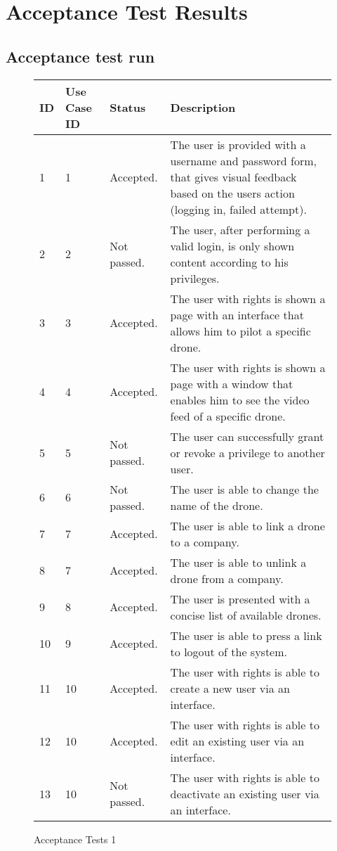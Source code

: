 \chapter{Acceptance Test Results}
\label{appendix:acceptance_test_results}

\section{Acceptance test run}
\begin{figure}[htb]
\begin{center}
\begin{tabular}{ | l | l | l | p{8cm} | }
  \hline
	\textbf{ID} & \textbf{Use Case ID} & \textbf{Status} & \textbf{Description} \\ \hline
	1 & 1 & Accepted. & The user is provided with a username and password form, that gives visual feedback based on the users action (logging in, failed attempt).\\ \hline
	2 & 2 & Not passed. & The user, after performing a valid login, is only shown content according to his privileges. \\ \hline
	3 & 3 & Accepted. & The user with rights is shown a page with an interface that allows him to pilot a specific drone.\\ \hline
	4 & 4 & Accepted. & The user with rights is shown a page with a window that enables him to see the video feed of a specific drone. \\ \hline
	5 & 5 & Not passed. & The user can successfully grant or revoke a privilege to another user. \\ \hline
	6 & 6 & Not passed. & The user is able to change the name of the drone. \\ \hline
	7 & 7 & Accepted. & The user is able to link a drone to a company.\\ \hline
	8 & 7 & Accepted. & The user is able to unlink a drone from a company.  \\ \hline
	9 & 8 & Accepted. & The user is presented with a concise list of available drones.  \\ \hline
	10 & 9 & Accepted. & The user is able to press a link to logout of the system.  \\ \hline
	11 & 10 & Accepted. & The user with rights is able to create a new user via an interface.  \\ \hline
	12 & 10 & Accepted. & The user with rights is able to edit an existing user via an interface.  \\ \hline
	13 & 10 & Not passed. & The user with rights is able to deactivate an existing user via an interface.  \\
	
  \hline
\end{tabular}
\caption{Acceptance Tests 1}
\label{tab:acceptance_tests1}
\end{center}
\end{figure}

